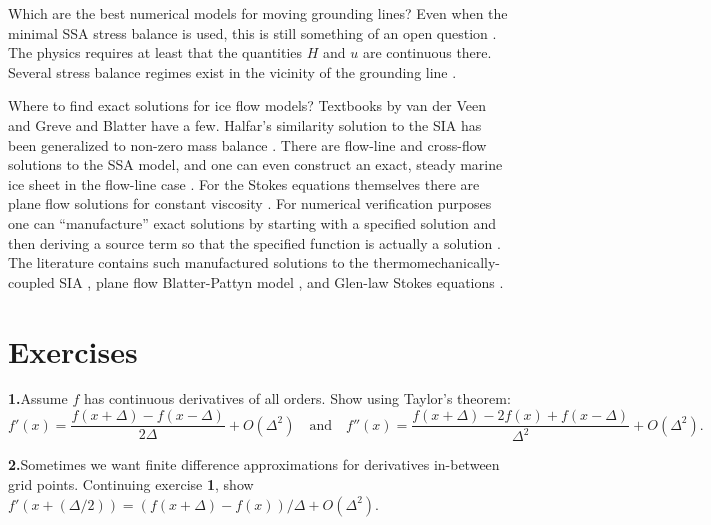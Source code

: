 \documentclass[letterpaper,final,12pt,reqno]{amsart}
\begin{document}
Which are the best numerical models for moving grounding lines?  Even when the minimal SSA stress balance is used, this is still something of an open question \cite{Feldmannetal2014,Goldbergetal2009,MISMIP3d2013,MISMIP2012,SchoofMarine1}.  The physics requires at least that the quantities $H$ and $u$ are continuous there.  Several stress balance regimes exist in the vicinity of the grounding line \cite{SchoofMarine2}.

Where to find exact solutions for ice flow models?  Textbooks by van der Veen \cite{vanderVeen} and Greve and Blatter \cite{GreveBlatter2009} have a few.  Halfar's similarity solution to the SIA \cite{Halfar81,Halfar83} has been generalized to non-zero mass balance \cite{BLKCB}.  There are flow-line \cite{Bodvardsson,vanderVeen83} and cross-flow \cite{SchoofStream} solutions to the SSA model, and one can even construct an exact, steady marine ice sheet in the flow-line case \cite{Bueler2014exactmarine}.  For the Stokes equations themselves there are plane flow solutions for constant viscosity \cite{BaliseRaymond1985}.  For numerical verification purposes one can ``manufacture'' exact solutions by starting with a specified solution and then deriving a source term so that the specified function is actually a solution \cite{Roache}.  The literature contains such manufactured solutions to the thermomechanically-coupled SIA \cite{BBL}, plane flow Blatter-Pattyn model \cite{GlowinskiRappaz}, and Glen-law Stokes equations \cite{JouvetRappaz2011,Lengetal2012,SargentFastook2010}.

\footnotesize

\bigskip
\bigskip
%


\bigskip
\bigskip
\small
\section*{Exercises}

\newcommand{\exer}[2]{\medskip\noindent \textbf{#1.}\quad #2}

\exer{1}{Assume $f$ has continuous derivatives of all orders.  Show using Taylor's theorem:
  $$f'(x) = \frac{f(x+\Delta) - f(x-\Delta)}{2\Delta} + O(\Delta^2) \quad \text{and} \quad f''(x) = \frac{f(x+\Delta) - 2 f(x) + f(x-\Delta)}{\Delta^2} + O(\Delta^2).$$}

\exer{2}{Sometimes we want finite difference approximations for derivatives in-between grid points.  Continuing exercise \textbf{1}, show $f'(x+(\Delta/2)) = (f(x+\Delta) - f(x))/\Delta + O(\Delta^2)$.}
\end{document}
